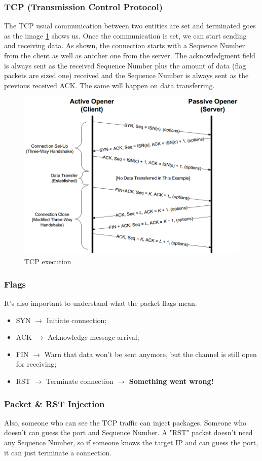 \documentclass[11pt]{article}
\begin{document}
{\subsubsection{TCP (Transmission Control Protocol)}
\label{sec:org7a94a2a}
The TCP usual communication between two entities are set and terminated goes as the image \ref{tcp} shows us. Once the communication is set, we can start sending and receiving data. As shown, the connection starts with a Sequence Number from the client as well as another one from the server. The acknowledgment field is always sent as the received Sequence Number plus the amount of data (flag packets are sized one) received and the Sequence Number is always sent as the previous received ACK. The same will happen on data transferring.  

\begin{figure}[htbp]
\centering
\includegraphics[height=0.5\textwidth]{res/TCP.png}
\caption{\label{tcp}
TCP execution}
\end{figure} 

\subsubsection{Flags}
\label{sec:org9ad6b7e}
It's also important to understand what the packet flags mean.
\begin{itemize}
\item SYN \(\to\) Initiate connection;
\item ACK \(\to\) Acknowledge message arrival;
\item FIN \(\to\) Warn that data won't be sent anymore, but the channel is still open for receiving;
\item RST \(\to\) Terminate connection \(\to\) \textbf{Something went wrong!}
\end{itemize}
\subsubsection{Packet \& RST Injection}
\label{sec:org96751bc}
Also, someone who can see the TCP traffic can inject packages. Someone who doesn't can guess the port and Sequence Number. A "RST" packet doesn't need any Sequence Number, so if someone knows the target IP and can guess the port, it can just terminate a connection.
}
\end{document}
